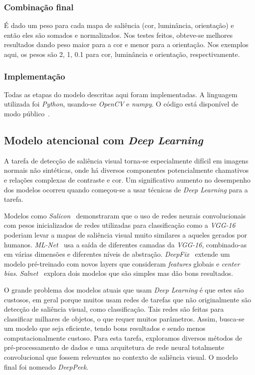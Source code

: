 \documentclass[11pt]{article}
\newcommand{\tit}[1]{\textit{#1}}
\begin{document}
\subsubsection{Combinação final}
É dado um peso para cada mapa de saliência (cor, luminância, orientação)
e então eles são somados e normalizados. Nos testes feitos, obteve-se
melhores resultados dando peso maior para a cor e menor para a orientação.
Nos exemplos aqui, os pesos são 2, 1, 0.1 para cor, luminância e orientação,
respectivamente.

\subsubsection{Implementação}
Todas as etapas do modelo descritas aqui foram implementadas.
A linguagem utilizada foi \tit{Python}, usando-se \tit{OpenCV} e \tit{numpy}.
O código está disponível de modo público~\cite{att}.

\subsection{Modelo atencional com \tit{Deep Learning}}
A tarefa de detecção de saliência visual torna-se especialmente difícil em
imagens normais não sintéticas, onde há diversos componentes potencialmente
chamativos e relações complexas de contraste e cor.
Um significativo aumento no desempenho dos modelos ocorreu quando começou-se
a usar técnicas de \tit{Deep Learning} para a tarefa.

Modelos como \emph{Salicon}~\cite{jiang_2015} demonstraram que o uso de redes
neurais convolucionais com
pesos inicializados de redes utilizadas para classificação como a
\emph{VGG-16}~\cite{zisserman_2014}
poderiam levar a mapas de saliência visual muito similares a aqueles
gerados por humanos.
\emph{ML-Net}~\cite{cornia_2016} usa a saída de diferentes camadas da
\emph{VGG-16}, combinado-as em várias dimensões e diferentes níveis de
abstração.
\emph{DeepFix}~\cite{kruthiventi_2015} extende um modelo pré-treinado com
novos layers que consideram \tit{features} globais e \tit{center bias}.
\emph{Salnet}~\cite{pan_2016} explora dois modelos que são simples mas
dão bons resultados.

O grande problema dos modelos atuais que usam \tit{Deep Learning} é que estes
são custosos, em geral porque muitos usam redes de tarefas que não
originalmente são detecção de saliência visual, como classificação.
Tais redes são feitas para classificar milhares de objetos, o que requer
muitos parâmetros. Assim, busca-se um modelo que seja eficiente,
tendo bons resultados e sendo menos computacionalmente custoso.
Para esta tarefa, exploramos diversos métodos de pré-processamento de dados
e uma arquitetura de rede neural totalmente convolucional que fossem relevantes
no contexto de saliência visual.
O modelo final foi nomeado \tit{DeepPeek}.
\end{document}
